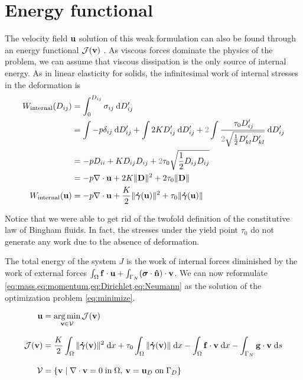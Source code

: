 \documentclass[11 pt]{report}
\begin{document}
\section{Energy functional}

The velocity field $\mathbf{u}$ solution of this weak formulation can also be found through an energy functional $\mathcal{J}(\mathbf{v})$ \cite{saramito2016complex, Bleyer}. As viscous forces dominate the physics of the problem, we can assume that viscous dissipation is the only source of internal energy. As in linear elasticity for solids, the infinitesimal work of internal stresses in the deformation is
\begin{equation}
    \begin{aligned}
        W_{\textrm{internal}}(D_{ij}) &= \int_{0}^{D_{ij}} \sigma_{ij} \:\dd D_{ij}'\\
        &= \int -p\delta_{ij} \:\dd D_{ij}' + \int 2K D_{ij}' \:\dd D_{ij}' + {\color{gray} 2} \int \frac{ \: \tau_0 D_{ij}'}{{\color{gray} 2} \sqrt{\frac{1}{2} D_{kl}'D_{kl}'}} \:\dd D_{ij}'\\
        &= -p D_{ii} + K D_{ij} D_{ij} + {\color{gray} 2} \tau_0 \sqrt{\frac{1}{2} D_{ij} D_{ij}}\\
        &= -p \nabla \cdot \uu + 2K \|\mathbf{D}\|^2 + 2\tau_0 \|\mathbf{D}\|\\
        W_{\textrm{internal}}(\uu) &= -p \nabla \cdot \uu + \frac{K}{2} \|\gam(\uu)\|^2 + \tau_0 \|\gam(\uu)\|
    \end{aligned}
    \label{eq:energy_density}
\end{equation}

Notice that we were able to get rid of the twofold definition of the constitutive law of Bingham fluids. In fact, the stresses under the yield point $\tau_0$ do not generate any work due to the absence of deformation.

The total energy of the system $J$ is the work of internal forces diminished by the work of external forces $\int_{\Omega} \mathbf{f} \cdot \mathbf{u} + \int_{\Gamma_N} (\boldsymbol \sigma \cdot \mathbf{\hat n}) \cdot \mathbf{v}$. We can now reformulate \cref{eq:mass,eq:momentum,eq:Dirichlet,eq:Neumann} as the solution of the optimization problem \eqref{eq:minimize}.
\begin{empheqboxed}
\begin{equation}
    \begin{aligned}
        \mathbf{u} &= \operatorname*{arg\,min}_{\mathbf{v} \in \mathcal{V}} \mathcal{J}(\mathbf{v})\\[8pt]
        \mathcal{J}(\mathbf{v}) &= \frac{K}{2}\int_{\Omega} \|\boldsymbol{\dot \gamma}(\mathbf{v})\|^2 \;\dd x + \tau_0 \int_{\Omega} \|\boldsymbol{\dot \gamma}(\mathbf{v})\| \;\dd x - \int_{\Omega} \mathbf{f}\cdot \mathbf{v} \; \dd x - \int_{\Gamma_N} \mathbf{g} \cdot \mathbf{v} \;\dd s\\[8pt]
        \mathcal{V} &= \{\mathbf{v} \;\vert\; \nabla \cdot \mathbf{v} = 0 \; \text{in} \; \Omega, \: \mathbf{v} = \mathbf{u}_{D} \;\text{on}\; \Gamma_D \}
    \end{aligned}\label{eq:minimize}
\end{equation}
\end{empheqboxed}
\end{document}
